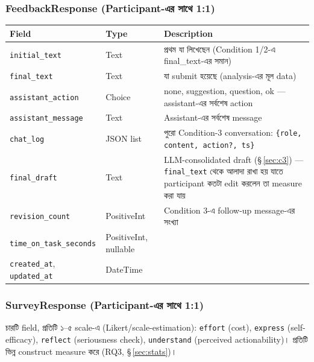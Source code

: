 \documentclass[11pt,a4paper]{article}
\newcommand{\code}[1]{\texttt{\small #1}}
\begin{document}
\subsubsection{FeedbackResponse (Participant-এর সাথে 1:1)}
\begin{longtable}{@{}p{3.8cm}p{2.8cm}p{8.8cm}@{}}
\toprule
\textbf{Field} & \textbf{Type} & \textbf{Description} \\
\midrule
\endhead
\code{initial\_text} & Text & প্রথম যা লিখেছেন (Condition 1/2-এ final\_text-এর সমান) \\
\code{final\_text} & Text & যা submit হয়েছে (analysis-এর মূল data) \\
\code{assistant\_action} & Choice & none, suggestion, question, ok --- assistant-এর সর্বশেষ
  action \\
\code{assistant\_message} & Text & Assistant-এর সর্বশেষ message \\
\code{chat\_log} & JSON list & পুরো Condition-3 conversation:
  \code{\{role, content, action?, ts\}} \\
\code{final\_draft} & Text & LLM-consolidated draft (\S\,\ref{sec:c3}) --- \code{final\_text}
  থেকে আলাদা রাখা হয় যাতে participant কতটা edit করলেন তা measure করা যায় \\
\code{revision\_count} & PositiveInt & Condition 3-এ follow-up message-এর সংখ্যা \\
\code{time\_on\_task\_seconds} & PositiveInt, nullable & \\
\code{created\_at}, \code{updated\_at} & DateTime & \\
\bottomrule
\end{longtable}

\subsubsection{SurveyResponse (Participant-এর সাথে 1:1)}
চারটি field, প্রতিটি ১--৫ scale-এ (Likert/scale-estimation): \code{effort} (cost),
\code{express} (self-efficacy), \code{reflect} (seriousness check), \code{understand}
(perceived actionability)। প্রতিটি ভিন্ন construct measure করে (RQ3, \S\,\ref{sec:stats})।
\end{document}
